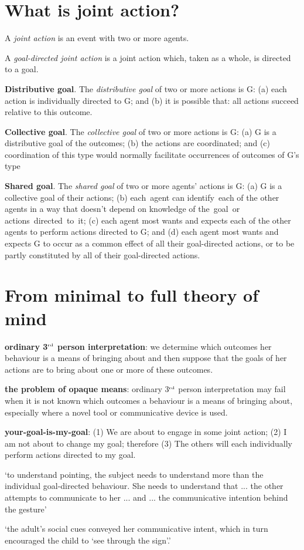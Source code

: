 \documentclass[11pt]{extarticle}
\begin{document}
\begin{multicols}{3}
\section{What is joint action?}


A \emph{joint action} is an event with two or more agents.\citep%
{ludwig_collective_2007}


A \emph{goal-directed joint action} is a joint action which, taken as a whole, is directed to a goal.

\textbf{Distributive goal}.  The \emph{distributive goal} of two or more actions is G: (a) each action is individually directed to G; and (b) it is possible that: all actions succeed relative to this outcome.

\textbf{Collective goal}.  The \emph{collective goal} of two or more actions is G:
(a) G is a distributive goal of the outcomes;
(b) the actions are coordinated; and 
(c) coordination of this type would normally  facilitate occurrences of outcomes of G's type


\textbf{Shared goal}.  The \emph{shared goal} of two or more agents' actions is G: (a) G is a collective goal of their actions; 
(b) each agent can identify each of the other agents in a way that doesn't depend on knowledge of the goal or	 actions directed to it;
(c) each agent most wants and expects each of the other agents to perform actions directed to G; and 
(d) each agent most wants and expects G to occur as a common effect of all their goal-directed actions, or to be partly constituted by all of their goal-directed actions.


\section{From minimal to full theory of mind}

\textbf{ordinary 3$^{\textrm{\tiny rd}}$ person interpretation}: we determine which outcomes her behaviour is a means of bringing about and then suppose that the goals of her actions are to bring about one or more of these outcomes.

\textbf{the problem of opaque means}: ordinary 3$^{\textrm{\tiny rd}}$ person interpretation may fail when it is not known which outcomes a behaviour is a means of bringing about, especially where a novel tool or communicative device is used.

\textbf{your-goal-is-my-goal}: (1) We are about to engage in some joint action; (2) I am not about to change my goal; therefore (3) The others will each individually perform actions directed to my goal.


`to understand pointing, the subject needs to understand more than the individual goal-directed behaviour. She needs to understand that ... the other attempts to communicate to her ...  and ... the communicative intention behind the gesture'\citep{Moll:2007gu}

`the adult’s social cues conveyed her communicative intent, which in turn encouraged the child to `see through the sign'.'
\citep%
{leekam_adults_2010}

\footnotesize 


\end{multicols}
\end{document}
